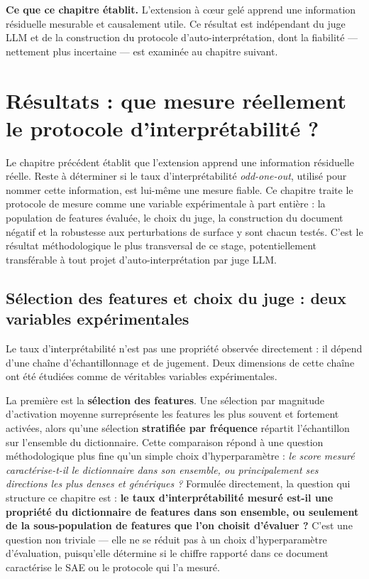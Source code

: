 \documentclass[11pt]{article}
\begin{document}
\medskip
\noindent\textbf{Ce que ce chapitre établit.} L'extension à cœur gelé apprend
une information résiduelle mesurable et causalement utile. Ce résultat est
indépendant du juge LLM et de la construction du protocole d'auto-interprétation,
dont la fiabilité --- nettement plus incertaine --- est examinée au chapitre
suivant.

\newpage
\section{Résultats : que mesure réellement le protocole d'interprétabilité ?}
\label{sec:resultats-mesure}

Le chapitre précédent établit que l'extension apprend une information
résiduelle réelle. Reste à déterminer si le taux d'interprétabilité
\emph{odd-one-out}, utilisé pour nommer cette information, est lui-même une
mesure fiable. Ce chapitre traite le protocole de mesure comme une variable
expérimentale à part entière : la population de features évaluée, le choix
du juge, la construction du document négatif et la robustesse aux
perturbations de surface y sont chacun testés. C'est le résultat
méthodologique le plus transversal de ce stage, potentiellement transférable
à tout projet d'auto-interprétation par juge LLM.

\subsection{Sélection des features et choix du juge : deux variables expérimentales}
\label{subsec:correction-methode}

Le taux d'interprétabilité n'est pas une propriété observée directement : il dépend
d'une chaîne d'échantillonnage et de jugement. Deux dimensions de cette chaîne ont
été étudiées comme de véritables variables expérimentales.

La première est la \textbf{sélection des features}. Une sélection par magnitude
d'activation moyenne surreprésente les features les plus souvent et fortement
activées, alors qu'une sélection \textbf{stratifiée par fréquence} répartit
l'échantillon sur l'ensemble du dictionnaire. Cette comparaison répond à une question
méthodologique plus fine qu'un simple choix d'hyperparamètre : \emph{le score mesuré
caractérise-t-il le dictionnaire dans son ensemble, ou principalement ses directions
les plus denses et génériques ?} Formulée directement, la question qui structure ce
chapitre est : \textbf{le taux d'interprétabilité mesuré est-il une propriété du
dictionnaire de features dans son ensemble, ou seulement de la sous-population de
features que l'on choisit d'évaluer ?} C'est une question non triviale --- elle ne se
réduit pas à un choix d'hyperparamètre d'évaluation, puisqu'elle détermine si le
chiffre rapporté dans ce document caractérise le SAE ou le protocole qui l'a mesuré.
\end{document}
